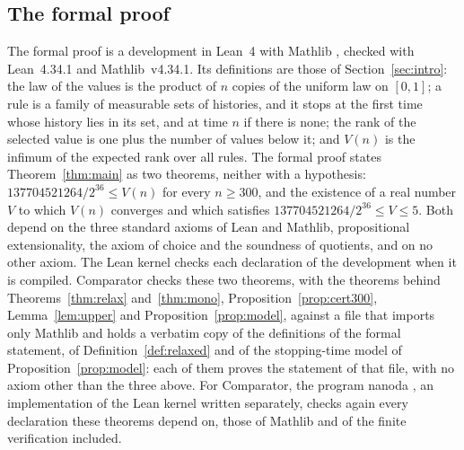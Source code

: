\documentclass[11pt]{amsart}
\theoremstyle{definition}
\numberwithin{equation}{section}
\newcommand{\computed}[1]{\ignorespaces}
\begin{document}
\subsection{The formal proof}\label{sec:formal-lean}\computed{code/formal-proof/main_axioms.lean, .github/workflows/ci.yml, config.json}
The formal proof \cite{RobbinsLean} is a development in Lean~4 \cite{Lean4} with Mathlib \cite{Mathlib20}, checked with Lean~4.34.1 and Mathlib~v4.34.1. Its definitions are those of Section~\ref{sec:intro}: the law of the values is the product of $n$ copies of the uniform law on $[0,1]$; a rule is a family of measurable sets of histories, and it stops at the first time whose history lies in its set, and at time $n$ if there is none; the rank of the selected value is one plus the number of values below it; and $V(n)$ is the infimum of the expected rank over all rules. The formal proof states Theorem~\ref{thm:main} as two theorems, neither with a hypothesis: $137704521264/2^{36}\le V(n)$ for every $n\ge300$, and the existence of a real number $V$ to which $V(n)$ converges and which satisfies $137704521264/2^{36}\le V\le5$. Both depend on the three standard axioms of Lean and Mathlib, propositional extensionality, the axiom of choice and the soundness of quotients, and on no other axiom. The Lean kernel checks each declaration of the development when it is compiled. Comparator \cite{Comparator} checks these two theorems, with the theorems behind Theorems~\ref{thm:relax} and~\ref{thm:mono}, Proposition~\ref{prop:cert300}, Lemma~\ref{lem:upper} and Proposition~\ref{prop:model}, against a file that imports only Mathlib and holds a verbatim copy of the definitions of the formal statement, of Definition~\ref{def:relaxed} and of the stopping-time model of Proposition~\ref{prop:model}: each of them proves the statement of that file, with no axiom other than the three above. For Comparator, the program nanoda \cite{nanoda}, an implementation of the Lean kernel written separately, checks again every declaration these theorems depend on, those of Mathlib and of the finite verification included.
\end{document}
